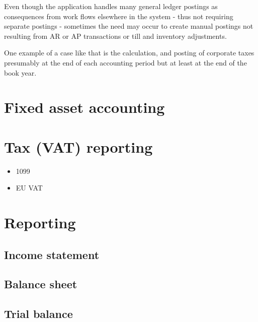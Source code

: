 Even though the application handles many general ledger postings as consequences
from work flows elsewhere in the system - thus not requiring separate postings -
sometimes the need may occur to create manual postings not resulting from
AR or AP transactions or till and inventory adjustments.

One example of a case like that is the calculation, and posting of
corporate taxes presumably at the end of each accounting period but at least
at the end of the book year.


\section{Fixed asset accounting}
\label{sec:FixedAssetAccounting}


\section{Tax (VAT) reporting}

\begin{itemize}
\item 1099
\item EU VAT
\end{itemize}


\section{Reporting}
\subsection{Income statement}
\subsection{Balance sheet}
\subsection{Trial balance}



